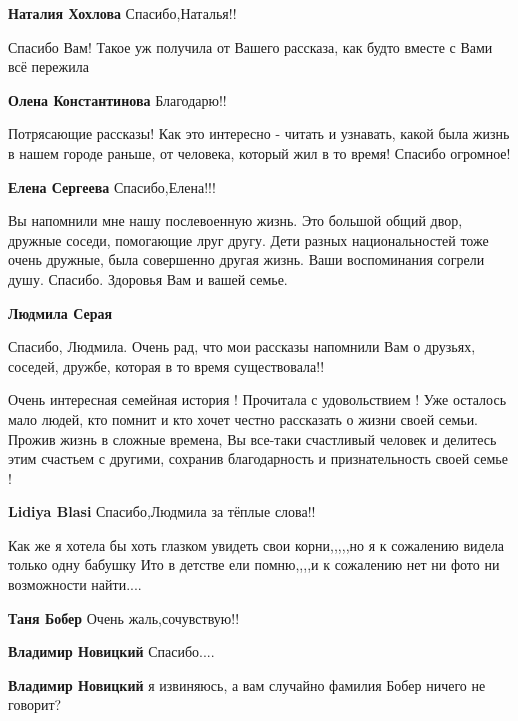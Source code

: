 \begin{itemize}
\textbf{Наталия Хохлова} Спасибо,Наталья!!

Спасибо Вам! Такое уж получила от Вашего рассказа, как будто вместе с Вами всё пережила

\textbf{Олена Константинова} Благодарю!!


Потрясающие рассказы! Как это интересно - читать и узнавать, какой была жизнь в
нашем городе раньше, от человека, который жил в то время! Спасибо огромное!


\textbf{Елена Сергеева} Спасибо,Елена!!!


Вы напомнили мне нашу послевоенную жизнь. Это большой общий двор, дружные
соседи, помогающие лруг другу. Дети разных национальностей тоже очень дружные,
была совершенно другая жизнь. Ваши воспоминания согрели душу. Спасибо. Здоровья
Вам и вашей семье.

\begin{itemize} %
\textbf{Людмила Серая} 

Спасибо, Людмила. Очень рад, что мои рассказы напомнили Вам о друзьях, соседей,
дружбе, которая в то время существовала!!
\end{itemize} %


Очень интересная семейная история ! Прочитала с удовольствием ! Уже осталось
мало людей, кто помнит и кто хочет честно рассказать о жизни своей семьи.
Прожив жизнь в сложные времена, Вы все-таки счастливый человек и делитесь этим
счастьем с другими, сохранив благодарность и признательность своей семье !


\textbf{Lidiya Blasi} Спасибо,Людмила за тёплые слова!!


Как же я хотела бы хоть глазком увидеть свои корни,,,,,но я к сожалению видела
только одну бабушку Ито в детстве ели помню,,,,и к сожалению нет ни фото ни
возможности найти....

\begin{itemize} %
\textbf{Таня Бобер} Очень жаль,сочувствую!!

\textbf{Владимир Новицкий} Спасибо....

\textbf{Владимир Новицкий} я извиняюсь, а вам случайно фамилия Бобер ничего не говорит?


\end{itemize}
\end{itemize}

